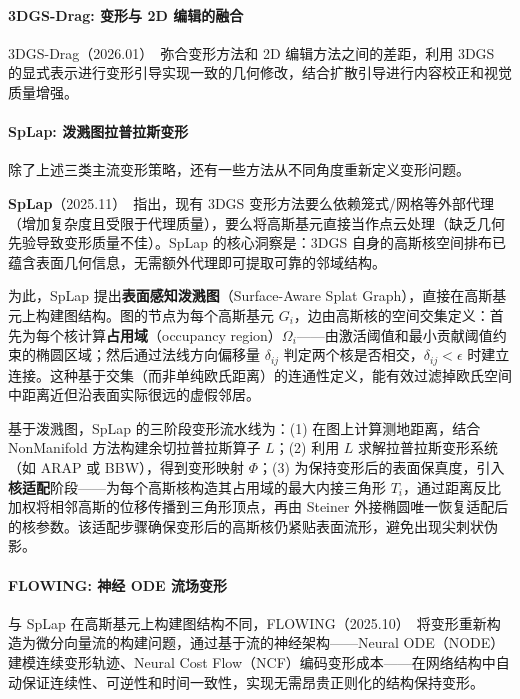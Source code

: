 \paragraph{3DGS-Drag: 变形与 2D 编辑的融合}

3DGS-Drag（2026.01）~\cite{2601_07963}弥合变形方法和 2D 编辑方法之间的差距，利用 3DGS 的显式表示进行变形引导实现一致的几何修改，结合扩散引导进行内容校正和视觉质量增强。

\paragraph{SpLap: 泼溅图拉普拉斯变形}

除了上述三类主流变形策略，还有一些方法从不同角度重新定义变形问题。

\textbf{SpLap}（2025.11）~\cite{2511_19542}指出，现有 3DGS 变形方法要么依赖笼式/网格等外部代理（增加复杂度且受限于代理质量），要么将高斯基元直接当作点云处理（缺乏几何先验导致变形质量不佳）。SpLap 的核心洞察是：3DGS 自身的高斯核空间排布已蕴含表面几何信息，无需额外代理即可提取可靠的邻域结构。

为此，SpLap 提出\textbf{表面感知泼溅图}（Surface-Aware Splat Graph），直接在高斯基元上构建图结构。图的节点为每个高斯基元 $G_i$，边由高斯核的空间交集定义：首先为每个核计算\textbf{占用域}（occupancy region）$\Omega_i$——由激活阈值和最小贡献阈值约束的椭圆区域；然后通过法线方向偏移量 $\delta_{ij}$ 判定两个核是否相交，$\delta_{ij} < \epsilon$ 时建立连接。这种基于交集（而非单纯欧氏距离）的连通性定义，能有效过滤掉欧氏空间中距离近但沿表面实际很远的虚假邻居。

基于泼溅图，SpLap 的三阶段变形流水线为：(1) 在图上计算测地距离，结合 NonManifold 方法构建余切拉普拉斯算子 $L$；(2) 利用 $L$ 求解拉普拉斯变形系统（如 ARAP 或 BBW），得到变形映射 $\Phi$；(3) 为保持变形后的表面保真度，引入\textbf{核适配}阶段——为每个高斯核构造其占用域的最大内接三角形 $T_i$，通过距离反比加权将相邻高斯的位移传播到三角形顶点，再由 Steiner 外接椭圆唯一恢复适配后的核参数。该适配步骤确保变形后的高斯核仍紧贴表面流形，避免出现尖刺状伪影。

\paragraph{FLOWING: 神经 ODE 流场变形}

与 SpLap 在高斯基元上构建图结构不同，FLOWING（2025.10）~\cite{2510_10152}将变形重新构造为微分向量流的构建问题，通过基于流的神经架构——Neural ODE（NODE）建模连续变形轨迹、Neural Cost Flow（NCF）编码变形成本——在网络结构中自动保证连续性、可逆性和时间一致性，实现无需昂贵正则化的结构保持变形。

